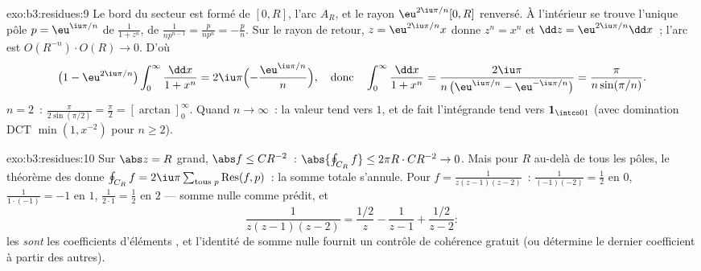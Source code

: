 \begin{solution}{exo:b3:residues:9}
Le bord du secteur est formé de $[0, R]$, l'arc $A_R$, et le
rayon $\eu^{2\iu\pi/n}[0, R]$ renversé. À l'intérieur se
trouve l'unique pôle $p = \eu^{\iu\pi/n}$ de $\frac1{1+z^n}$,
de  $\frac1{np^{n-1}} = \frac{p}{np^n} = -\frac pn$.
Sur le rayon de retour, $z = \eu^{2\iu\pi/n}x$ donne $z^n =
x^n$ et $\dd z = \eu^{2\iu\pi/n}\dd x$~; l'arc est
$O(R^{-n})\cdot O(R) \to 0$. D'où
\[
\bigl(1 - \eu^{2\iu\pi/n}\bigr)
\int_0^\infty\frac{\dd x}{1 + x^n}
= 2\iu\pi\Bigl(-\frac{\eu^{\iu\pi/n}}n\Bigr),
\quad\text{donc}\quad
\int_0^\infty\frac{\dd x}{1+x^n}
= \frac{2\iu\pi}{n\,\bigl(\eu^{\iu\pi/n} -
\eu^{-\iu\pi/n}\bigr)} = \frac{\pi}{n\sin(\pi/n)} .
\]
$n = 2$~: $\frac\pi{2\sin(\pi/2)} = \frac\pi2 =
[\arctan]_0^\infty$. Quand $n \to \infty$~: la valeur tend
vers $1$, et de fait l'intégrande tend vers $\mathbf
1_{\intco01}$ (avec domination DCT $\min(1, x^{-2})$ pour
$n \geq 2$).
\end{solution}

\begin{solution}{exo:b3:residues:10}
Sur $\abs z = R$ grand, $\abs f \leq C R^{-2}$~:
$\abs{\oint_{C_R} f} \leq 2\pi R\cdot CR^{-2} \to 0$. Mais
pour $R$ au-delà de tous les pôles, le théorème des 
donne $\oint_{C_R}f = 2\iu\pi\sum_{\text{tous }p}
\operatorname{Res}(f, p)$~: la somme totale s'annule. Pour
$f = \frac1{z(z-1)(z-2)}$~:  $\frac1{(-1)(-2)} =
\frac12$ en $0$, $\frac1{1\cdot(-1)} = -1$ en $1$,
$\frac1{2\cdot1} = \frac12$ en $2$ --- somme nulle comme
prédit, et
\[
\frac1{z(z-1)(z-2)} = \frac{1/2}{z} - \frac1{z - 1} +
\frac{1/2}{z-2} :
\]
les  \emph{sont} les coefficients d'éléments
, et l'identité de somme nulle fournit un contrôle de
cohérence gratuit (ou détermine le dernier coefficient à
partir des autres).
\end{solution}

